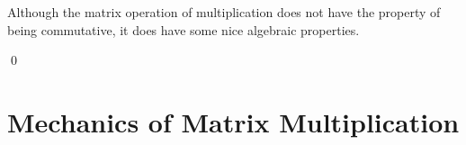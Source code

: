 \begin{frame}
Although the matrix operation of multiplication does not have
the property of being commutative,
it does have some nice algebraic properties.  

\th[th:MatMultWellBehaved]
\pause
\pf
{}

{}
\qed
\end{frame}




\section{Mechanics of Matrix Multiplication}

